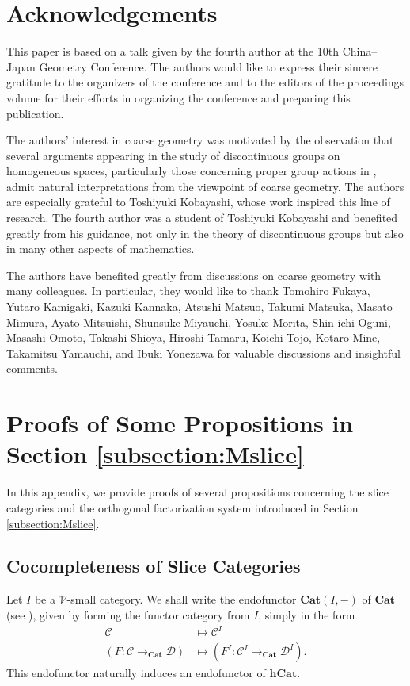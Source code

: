 \documentclass[12pt, a4paper]{amsart}
\theoremstyle{definition}
\newcommand{\Cat}{{\mathbf{Cat}}}
\newcommand{\hCat}{{\mathbf{hCat}}}
\begin{document}
\section*{Acknowledgements}

This paper is based on a talk given by the fourth author at the 10th China--Japan Geometry Conference. The authors would like to express their sincere gratitude to the organizers of the conference and to the editors of the proceedings volume for their efforts in organizing the conference and preparing this publication.

The authors' interest in coarse geometry was motivated by the observation that several arguments appearing in the study of discontinuous groups on homogeneous spaces, particularly those concerning proper group actions in \cite{Kobayashi96}, admit natural interpretations from the viewpoint of coarse geometry. The authors are especially grateful to Toshiyuki Kobayashi, whose work inspired this line of research. The fourth author was a student of Toshiyuki Kobayashi and benefited greatly from his guidance, not only in the theory of discontinuous groups but also in many other aspects of mathematics.

The authors have benefited greatly from discussions on coarse geometry with many colleagues. In particular, they would like to thank Tomohiro Fukaya, Yutaro Kamigaki, Kazuki Kannaka, Atsushi Matsuo, Takumi Matsuka, Masato Mimura, Ayato Mitsuishi, Shunsuke Miyauchi, Yosuke Morita, Shin-ichi Oguni, Masashi Omoto, Takashi Shioya, Hiroshi Tamaru, Koichi Tojo, Kotaro Mine, Takamitsu Yamauchi, and Ibuki Yonezawa for valuable discussions and insightful comments.

\appendix


\section{Proofs of Some Propositions in Section \ref{subsection:Mslice}}\label{section:app:proofMslice}

In this appendix, we provide proofs of several propositions concerning the slice categories and the orthogonal factorization system introduced in Section \ref{subsection:Mslice}.

\subsection{Cocompleteness of Slice Categories}

Let $I$ be a $\mathcal{V}$-small category. We shall write the endofunctor $\Cat(I,-)$ of $\Cat$ (see \cite[Chapter~II, Section~5]{MacLane1971Working}), given by forming the functor category from $I$, simply in the form
\begin{align*}
    \mathcal{C} &\mapsto \mathcal{C}^I \\
    (F : \mathcal{C} \rightarrow_\Cat \mathcal{D}) &\mapsto (F^I : \mathcal{C}^I \rightarrow_\Cat \mathcal{D}^I).
\end{align*}
This endofunctor naturally induces an endofunctor of $\hCat$.
\end{document}
